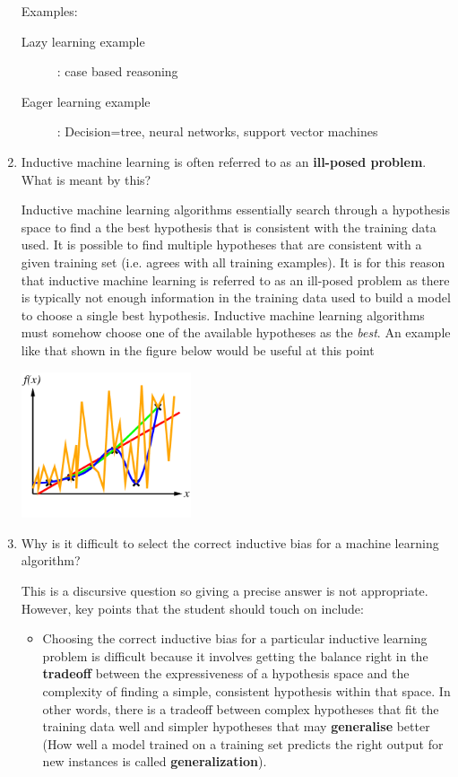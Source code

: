 \documentclass[solution]{ditpaper}
\begin{document}
\begin{enumerate}
\begin{answer}
			Examples:
			\begin{description}
				\item [Lazy learning example]: case based reasoning
				\item [Eager learning example]: Decision=tree, neural networks, support vector machines
			\end{description}
		\end{answer}
	\item  Inductive machine learning is often referred to as an \textbf{ill-posed problem}. What is meant by this?
	\begin{answer}
		Inductive machine learning algorithms essentially search through a hypothesis space to find a the best hypothesis that is consistent with the training data used. It is possible to find multiple hypotheses that are  consistent with a given training set (i.e. agrees with all training examples).  It is for this reason that inductive machine learning is referred to as an ill-posed problem as there is typically not enough information in the training data used to build a model to choose a single best hypothesis. Inductive machine learning algorithms must somehow choose one of the available hypotheses as the \emph{best}. An example like that shown in the figure below would be useful at this point
		\begin{center}
			\includegraphics[width=5cm]{./images/curve-fitting5.png}
		\end{center}
	\end{answer}
\item Why is it difficult to select the correct inductive bias for a machine learning algorithm?
\begin{answer}
This is a discursive question so giving a precise answer is not appropriate. However, key points that the student should touch on include:
		\begin{itemize}
			\item Choosing the correct inductive bias for a particular inductive learning problem is difficult because it involves getting the balance right in the \textbf{tradeoff} between the expressiveness of a hypothesis space and the complexity of finding a simple, consistent hypothesis within that space. In other words, there is a tradeoff between complex hypotheses that fit the training data well and simpler hypotheses that may \textbf{generalise} better (How well a model trained on a training set predicts the right output for new instances is called \textbf{generalization}).

\end{itemize}
\end{answer}
\end{enumerate}
\end{document}
